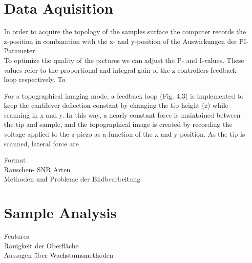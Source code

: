 \documentclass[paper=a4,fontsize=10pt,DIV=18,twocolumn,parskip=half]{scrartcl}
\numberwithin{equation}{section}    %
\begin{document}
\section{Data Aquisition}
\label{dataaquisition}
In order to acquire the topology of the samples surface the computer records the z-position in combination with the x- and y-position of the 
Auswirkungen der PI-Parameter\\
To optimize the quality of the pictures we can adjust the P- and I-values. These values refer to the proportional and integral-gain of the z-controllers feedback loop respectively. To 

For a topographical imaging mode, a feedback loop (Fig. 4.3) is
implemented to keep the cantilever deflection constant by changing the tip height (z)
while scanning in x and y. In this way, a nearly constant force is maintained between the
tip and sample, and the topographical image is created by recording the voltage applied to
the z-piezo as a function of the x and y position. As the tip is scanned, lateral force are


Format\\
Rauschen- SNR  Arten \\
Methoden und Probleme der Bildbearbeitung\\
\section{Sample Analysis}
Features\\
Rauigkeit der Oberfläche\\
Aussagen über Wachstumsmethoden\\
\end{document}
